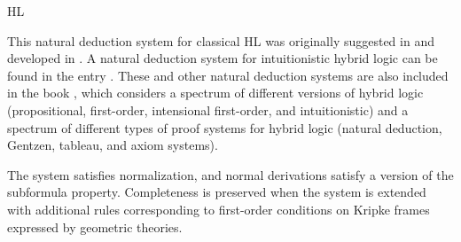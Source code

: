 \begin{entry}{HL}
\begin{history}
This natural deduction system for classical HL was originally suggested in
\cite{Brauner01c} and developed in \cite{Brauner01b}. A natural deduction system for intuitionistic hybrid logic can be found in the entry . These and other natural deduction systems are also included in the book \cite{Brauner11a}, which considers a spectrum of different versions of hybrid logic
(propositional, first-order, intensional first-order, and intuitionistic)
and a spectrum of different types of proof systems for
hybrid logic (natural deduction, Gentzen, tableau, and axiom systems).
\end{history}

\begin{technicalities}
The system satisfies normalization, and normal derivations satisfy a version of the subformula property. Completeness is preserved when the system is extended with additional rules corresponding to first-order conditions on Kripke frames expressed by geometric theories.
\end{technicalities}

\end{entry}
